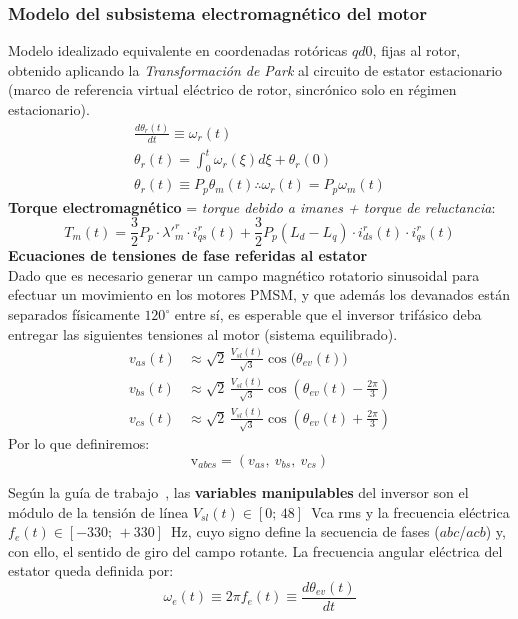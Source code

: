 \documentclass[12pt, a4paper,journal, onecolumn, compsoc]{IEEEtran}
\begin{document}
    \subsubsection{Modelo del subsistema electromagnético del motor}
    Modelo idealizado equivalente en coordenadas rotóricas \(qd0\), fijas al rotor, obtenido aplicando la \textit{Transformación de Park} al circuito de estator estacionario (marco de referencia virtual eléctrico de rotor, sincrónico solo en régimen estacionario).
    \begin{gather}
        \frac{d\theta_r(t)}{dt} \equiv \omega_r(t) \\
        \theta_r(t)=\int_0^t{\omega_r(\xi)d\xi+\theta_r(0)} \\
        \theta_r(t) \equiv P_p\theta_m(t) \therefore \omega_r(t) = P_p\omega_m(t)
    \end{gather}
    \textbf{Torque electromagnético} = \textit{torque debido a imanes + torque de reluctancia}:
    \begin{equation}
            T_m(t) = \frac{3}{2} P_p \cdot \lambda'^r_m \cdot i^r_{qs}(t) + \frac{3}{2} P_p (L_d-L_q)\cdot i^r_{ds}(t)\cdot i^r_{qs}(t)
            \label{eq:torque_electromagnetico}
    \end{equation}
\textbf{Ecuaciones de tensiones de fase referidas al estator}\\
Dado que es necesario generar un campo magnético rotatorio sinusoidal para efectuar un movimiento en los motores PMSM, y que además los devanados están separados físicamente \(120^\circ\) entre sí, es esperable que el inversor trifásico deba entregar las siguientes tensiones al motor (sistema equilibrado).
\begin{align}
v_{as}(t) &\approx \sqrt{2}\,\frac{V_{sl}(t)}{\sqrt{3}} \cos\big(\theta_{ev}(t)\big) \\
v_{bs}(t) &\approx \sqrt{2}\,\frac{V_{sl}(t)}{\sqrt{3}} \cos\left(\theta_{ev}(t) - \frac{2\pi}{3}\right) \\
v_{cs}(t) &\approx \sqrt{2}\,\frac{V_{sl}(t)}{\sqrt{3}} \cos\left(\theta_{ev}(t) + \frac{2\pi}{3}\right)
\end{align}
Por lo que definiremos:
\[\bm{\mathrm{v}}_{abcs} = (v_{as},\ v_{bs},\ v_{cs})\]

Según la guía de trabajo~\cite{guia_trabajo}, las \textbf{variables manipulables} del inversor son el módulo de la tensión de línea $V_{sl}(t) \in [0;\,48]$~Vca rms y la frecuencia eléctrica $f_e(t) \in [-330;\,+330]$~Hz, cuyo signo define la secuencia de fases ($abc$/$acb$) y, con ello, el sentido de giro del campo rotante. La frecuencia angular eléctrica del estator queda definida por:
\begin{equation}
    \omega_e(t) \equiv 2\pi f_e(t) \equiv \frac{d\theta_{ev}(t)}{dt}
\end{equation}
\end{document}
